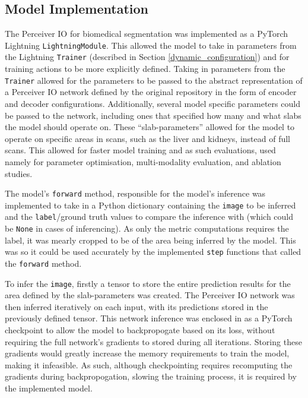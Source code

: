 \documentclass{l4proj}
\begin{document}
\subsection{Model Implementation}

The Perceiver IO for biomedical segmentation was implemented as a PyTorch Lightning \lstinline{LightningModule}. This allowed the model to take in parameters from the Lightning \lstinline{Trainer} (described in Section \ref{dynamic_configuration}) and for training actions to be more explicitly defined. Taking in parameters from the \lstinline{Trainer} allowed for the parameters to be passed to the abstract representation of a Perceiver IO network defined by the original repository \citep{Krasser_A_PyTorch_implementation_2023} in the form of encoder and decoder configurations. Additionally, several model specific parameters could be passed to the network, including ones that specified how many and what slabs the model should operate on. These “slab-parameters” allowed for the model to operate on specific areas in scans, such as the liver and kidneys, instead of full scans. This allowed for faster model training and as such evaluations, used namely for parameter optimisation, multi-modality evaluation, and ablation studies.

The model’s \lstinline{forward} method, responsible for the model’s inference was implemented to take in a Python dictionary containing the \lstinline{image} to be inferred and the \lstinline{label}/ground truth values to compare the inference with (which could be \lstinline{None} in cases of inferencing). As only the metric computations requires the label, it was mearly cropped to be of the area being inferred by the model. This was so it could be used accurately by the implemented \lstinline{step} functions that called the \lstinline{forward} method.

To infer the \lstinline{image}, firstly a tensor to store the entire prediction results for the area defined by the slab-parameters was created. The Perceiver IO network was then inferred iteratively on each input, with its predictions stored in the previously defined tensor. This network inference was enclosed in as a PyTorch checkpoint to allow the model to backpropogate based on its loss, without requiring the full network’s gradients to stored during all iterations. Storing these gradients would greatly increase the memory requirements to train the model, making it infeasible. As such, although checkpointing requires recomputing the gradients during backpropogation, slowing the training process, it is required by the implemented model.
\end{document}
